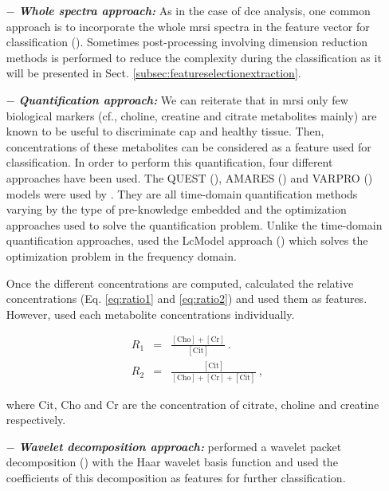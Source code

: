\begin{enumerate}[leftmargin=*]

\item[$-$] \textbf{\textit{Whole spectra approach:}} As in the case of \ac{dce} analysis, one common approach is to incorporate the whole \ac{mrsi} spectra in the feature vector for classification (\cite{Kelm2007,Parfait2012,Tiwari2007,Tiwari2009,Tiwari2013,Tiwari2009a,Tiwari2010,Viswanath2008a,Matulewicz2013}). Sometimes post-processing involving dimension reduction methods is performed to reduce the complexity during the classification as it will be presented in Sect. \ref{subsec:featureselectionextraction}.

\item[$-$] \textbf{\textit{Quantification approach:}} We can reiterate that in \ac{mrsi} only few biological markers (cf., choline, creatine and citrate metabolites mainly) are known to be useful to discriminate \ac{cap} and healthy tissue. Then, concentrations of these metabolites can be considered as a feature used for classification. In order to perform this quantification, four different approaches have been used. The QUEST (\cite{Ratiney2005}), AMARES (\cite{Vanhamme1997}) and VARPRO (\cite{Coleman1993}) models were used by \cite{Kelm2007}. They are all time-domain quantification methods varying by the type of pre-knowledge embedded and the optimization approaches used to solve the quantification problem. Unlike the time-domain quantification approaches, \cite{Parfait2012} used the LcModel approach (\cite{Provencher1993}) which solves the optimization problem in the frequency domain.

Once the different concentrations are computed, \cite{Kelm2007} calculated the relative concentrations (Eq. \eqref{eq:ratio1} and \eqref{eq:ratio2}) and used them as features. However, \cite{Parfait2012} used each metabolite concentrations individually.

\begin{eqnarray}
	R_1 & = & \frac{ [ \text{Cho} ] + [ \text{Cr} ]}{[ \text{Cit} ]} \ . \label{eq:ratio1} \\
	R_2 & = & \frac{[ \text{Cit} ]}{[\text{Cho}]+[\text{Cr}]+[\text{Cit}]} \ , \label{eq:ratio2}
\end{eqnarray}

\noindent where $\text{Cit}$, $\text{Cho}$ and $\text{Cr}$ are the concentration of citrate, choline and creatine respectively.

\item[$-$] \textbf{\textit{Wavelet decomposition approach:}} \cite{Tiwari2012} performed a wavelet packet decomposition (\cite{Coifman1992}) with the Haar wavelet basis function and used the coefficients of this decomposition as features for further classification.

\end{enumerate}